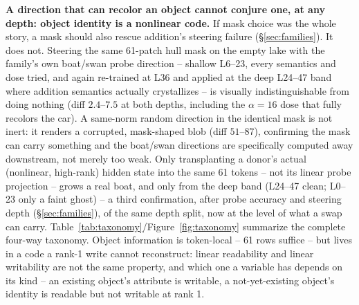 \documentclass[10pt,twocolumn,letterpaper]{article}
\begin{document}
\textbf{A direction that can recolor an object cannot conjure one, at
any depth: object identity is a nonlinear code.} If mask choice was the
whole story, a mask should also rescue addition's steering failure
(\S\ref{sec:families}). It does not. Steering the same 61-patch hull
mask on the empty lake with the family's own boat/swan probe direction
-- shallow L6--23, every semantics and dose tried, and again re-trained
at L36 and applied at the deep L24--47 band where addition semantics
actually crystallizes -- is visually indistinguishable from doing
nothing (diff $2.4$--$7.5$ at both depths, including the $\alpha{=}16$
dose that fully recolors the car). A same-norm random direction in the
identical mask is not inert: it renders a corrupted, mask-shaped blob
(diff $51$--$87$), confirming the mask can carry something and the
boat/swan directions are specifically computed away downstream, not
merely too weak. Only transplanting a donor's actual (nonlinear,
high-rank) hidden state into the same 61 tokens -- not its linear probe
projection -- grows a real boat, and only from the deep band (L24--47
clean; L0--23 only a faint ghost) -- a third confirmation,
after probe accuracy and steering depth (\S\ref{sec:families}), of the
same depth split, now at the level of what a swap can carry.
Table~\ref{tab:taxonomy}/Figure~\ref{fig:taxonomy} summarize the
complete four-way taxonomy. Object information is token-local -- 61
rows suffice -- but lives in a code a rank-1 write cannot reconstruct:
linear readability and linear writability are not the same property, and
which one a variable has depends on its kind -- an existing object's
attribute is writable, a not-yet-existing object's identity is readable
but not writable at rank 1.
\end{document}
